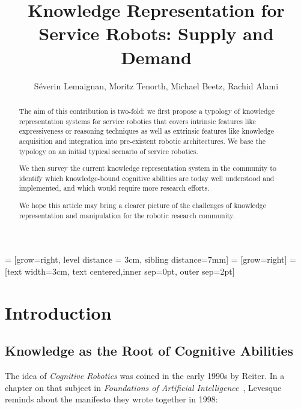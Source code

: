 \documentclass{IEEEtran}
\title{Knowledge Representation for Service Robots: Supply and Demand}
\author{Séverin Lemaignan, Moritz Tenorth, Michael Beetz, Rachid Alami}
\begin{document}
 = [grow=right, level distance = 3cm, sibling
distance=7mm]
 = [grow=right]
 = [text width=3cm, text centered,inner sep=0pt, outer
sep=2pt] %

\maketitle
\tableofcontents


\begin{abstract}

The aim of this contribution is two-fold: we first propose a typology of
knowledge representation systems for service robotics that covers intrinsic
features like expressiveness or reasoning techniques as well as extrinsic
features like knowledge acquisition and integration into pre-existent robotic
architectures. We base the typology on an initial typical scenario of service
robotics.

We then survey the current knowledge representation system in the community to
identify which knowledge-bound cognitive abilities are today well understood
and implemented, and which would require more research efforts.

We hope this article may bring a clearer picture of the challenges of knowledge
representation and manipulation for the robotic research community.

\end{abstract}



\section{Introduction}
\label{sect|intro}

\subsection{Knowledge as the Root of Cognitive Abilities}
\label{sect|cognitive-abilities}

The idea of \emph{Cognitive Robotics} was coined in the early 1990s by Reiter.
In a chapter on that subject in \emph{Foundations of Artificial
Intelligence}~\cite{Levesque2008}, Levesque reminds about the manifesto they
wrote together in 1998:
\end{document}
